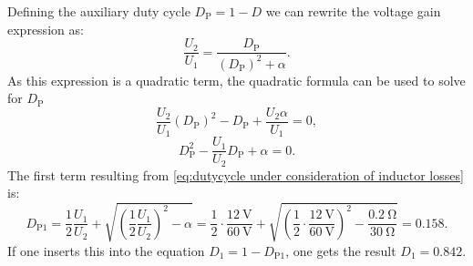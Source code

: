 \begin{solutionblock}
	Defining the auxiliary duty cycle $D_\mathrm{P}=1-D$ we can rewrite the voltage gain expression as:
	\begin{equation}
		\frac{U_\mathrm{2}}{U_\mathrm{1}}=\frac{D_\mathrm{P}}{(D_\mathrm{P})^2+\alpha}.
	\end{equation}
	As this expression is a quadratic term, the quadratic formula  can be used to solve for $D_\mathrm{P}$
	\begin{equation}
		\frac{U_\mathrm{2}}{U_\mathrm{1}}(D_\mathrm{P})^2-D_\mathrm{P}+\frac{U_\mathrm{2}\alpha}{U_\mathrm{1}}=0,
	\end{equation}
	\begin{equation}
		D_\mathrm{P}^2 - \frac{U_\mathrm{1}}{U_\mathrm{2}} D_\mathrm{P}+\alpha=0. \label{eq:dutycycle under consideration of inductor losses}
	\end{equation}
	The first term resulting from \eqref{eq:dutycycle under consideration of inductor losses} is:
	\begin{equation}
		D_\mathrm{P1}=\frac{1}{2}\frac{U_\mathrm{1}}{U_\mathrm{2}}+\sqrt{\left(\frac{1}{2}\frac{U_\mathrm{1}}{U_\mathrm{2}}\right)^2-\alpha}= \frac{1}{2}\cdot\frac{\SI{12}{\volt}}{\SI{60}{\volt}}+\sqrt{\left({\frac{1}{2}}\cdot\frac{\SI{12}{\volt}}{\SI{60}{\volt}}\right)^2-\frac{\SI{0.2}{\ohm}}{\SI{30}{\ohm}}}= 0.158.
	\end{equation}
	If one inserts this into the equation $D_\mathrm{1}=1-D_\mathrm{P1}$, one gets the result $D_\mathrm{1}=0.842$.


\end{solutionblock}
